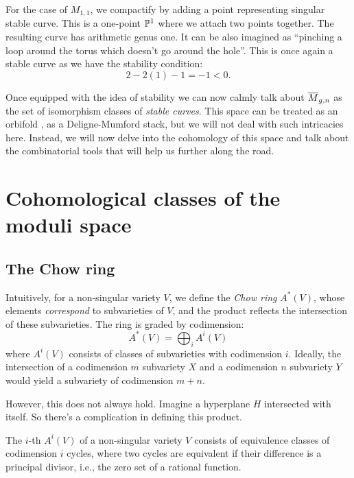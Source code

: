 \documentclass[12pt]{memoir}
\begin{document}
\begin{Ex}\label{ex-Mg1n1-compactification}
    For the case of $M_{1,1}$, we compactify by adding a point representing singular stable curve. This is a one-point $\mathbb{P}^1$ where we attach two points together. The resulting curve has arithmetic genus one. It can be also imagined as ``pinching a loop around the torus which doesn't go around the hole''. This is once again a stable curve as we have the stability condition:
    $$2-2(1)-1=-1<0.$$
\end{Ex}

Once equipped with the idea of stability we can now calmly talk about $\overline M_{g,n}$ as the set of isomorphism classes of \emph{stable curves}. This space can be treated as an orbifold \cite{ZvonkineIntro}, as a Deligne-Mumford stack, but we will not deal with such intricacies here. Instead, we will now delve into the cohomology of this space and talk about the combinatorial tools that will help us further along the road.

\section{Cohomological classes of the moduli space}

\subsection{The Chow ring}
Intuitively, for a non-singular variety $V$, we define the \emph{Chow ring} $A^\ast(V)$, whose elements \emph{correspond} to subvarieties of $V$, and the product reflects the intersection of these subvarieties. The ring is graded by codimension:
$$A^\ast(V) = \bigoplus_i A^i(V)$$
where $A^i(V)$ consists of classes of subvarieties with codimension $i$. Ideally, the intersection of a codimension $m$ subvariety $X$ and a codimension $n$ subvariety $Y$ would yield a subvariety of codimension $m+n$.\par
However, this does not always hold. Imagine a hyperplane $H$ intersected with itself. So there's a complication in defining this product.

\begin{Def}
    The $i$-th  $A^i(V)$ of a non-singular variety $V$ consists of equivalence classes of codimension $i$ cycles, where two cycles are equivalent if their difference is a principal divisor, i.e., the zero set of a rational function.
\end{Def}
\end{document}
